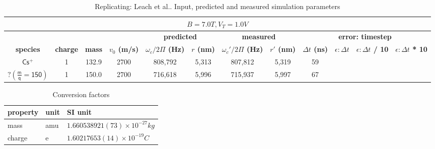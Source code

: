 \documentclass[10pt,conference,onecolumn]{IEEEtran}
\begin{document}
\begin{table}[htbp]
 \centering	  	  
 \caption{Replicating: Leach et al.\cite{Leach2009}. Input, predicted and measured simulation parameters}
\label{tab:leach}
\begin{tabular}{c|c|c|c|c|c|c|c|c|c|c|c}
 \hline \hline
  \multicolumn{12}{|c|}{$B = 7.0 T, V_T = 1.0 V$} \\
 \hline \hline
 \multicolumn{4}{|c|}{ } & \multicolumn{2}{|c|}{\textbf{predicted}} & \multicolumn{2}{|c|}{\textbf{measured}} & \multicolumn{4}{|c|}{\textbf{error: timestep}} \\ 
 \hline
 \textbf{species} & \textbf{charge} & \textbf{mass} & \textbf{$v_0$ (m/s)} & \textbf{$\omega_c / 2\Pi$ (Hz)} & \textbf{$r$ (nm)} & \textbf{$\omega_c' / 2\Pi$ (Hz)}  & \textbf{$r'$ (nm)} & \textbf{$\Delta t$ (ns)} & \textbf{$\epsilon: \Delta t$}& \textbf{$\epsilon: \Delta t$ / 10} & \textbf{$\epsilon: \Delta t$ * 10}\\ 
 \hline
 $\mathsf{Cs^+}$ & 1 & 132.9 & 2700 & 808,792 & 5,313 & 807,812 & 5,319 & 59 & \\
 $\mathsf{? (\frac{m}{q} = 150 )}$ & 1 & 150.0 & 2700 & 716,618 & 5,996 & 715,937 & 5,997 & 67 & \\
 \hline \hline
\end{tabular}
\end{table}


\begin{table}[htbp]
 \centering	  	  
 \caption{Conversion factors}
\label{tab:conversion}
\begin{tabular}{l|l|l}
\hline \hline
\textbf{property} & \textbf{unit} & \textbf{SI unit} \\
\hline
mass & amu & $1.660538921(73) \times 10^{ - 27} kg$ \\
charge & e   & $1.60217653(14) \times 10^{ - 19} C$ \\
\hline \hline
\end{tabular}
\end{table}



\end{document}
